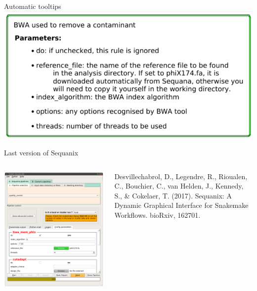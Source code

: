 \documentclass{beamer}
\begin{document}
\begin{frame}{Automatic tooltips}
  \centering
  \includegraphics[scale=0.4]{images/tooltip.png}
\end{frame}

\begin{frame}{Last version of Sequanix}
  \begin{columns}
    \begin{column}{0.6\textwidth}
      \includegraphics[scale=0.17]{images/sequanix_paused.png}
    \end{column}
    \begin{column}{0.4\textwidth}
        Desvillechabrol, D., Legendre, R., Rioualen, C., Bouchier, C., van Helden, J., Kennedy, S., \& Cokelaer, T. (2017). Sequanix: A Dynamic Graphical Interface for Snakemake Workflows. bioRxiv, 162701.
    \end{column}
  \end{columns}
\end{frame}
\end{document}
